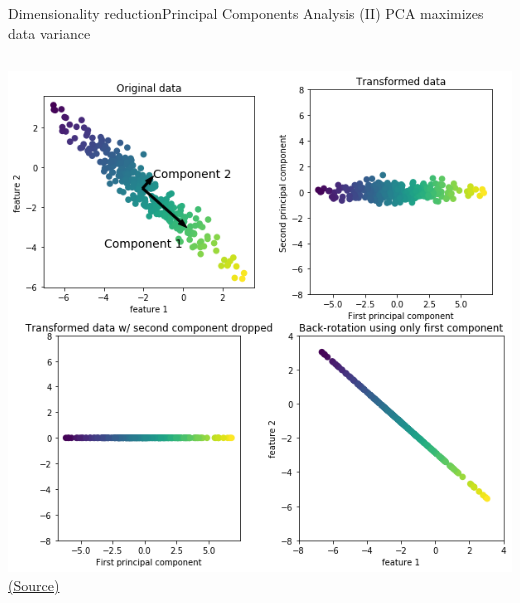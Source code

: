 \documentclass[10pt,compress]{beamer} %
\begin{document}
\begin{frame}{Dimensionality reduction}{Principal Components Analysis (II)}
	PCA maximizes data variance

    \begin{columns}
			\includegraphics[width=\linewidth]{figs/pca.png}
    		\centering \tiny{\href{https://github.com/amueller/introduction_to_ml_with_python/blob/master/03-unsupervised-learning.ipynb}{(Source)}}
    \end{columns}
\end{frame}
\end{document}
